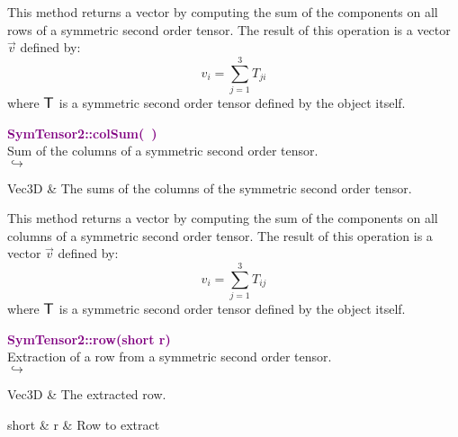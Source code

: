 This method returns a vector by computing the sum of the components on all rows of a symmetric second order tensor.
The result of this operation is a vector $\overrightarrow{v}$ defined by:
\begin{equation*}
v_{i}=\sum_{j=1}^{3} T_{ji}
\end{equation*}
where $\mbox{\large\ensuremath{\mathsf{T}}}$ is a symmetric second order tensor defined by the object itself.

\textcolor{purple}{\textbf{SymTensor2::colSum(~)}}\label{SymTensor2::colSum()}\\
Sum of the columns of a symmetric second order tensor.\\ \hspace*{5mm}$\hookrightarrow$
\vspace*{-2em}\begin{tcolorbox}[grow to left by=-1cm, width=\textwidth-1cm,myArgs,tabularx={l|R}]
Vec3D & The sums of the columns of the symmetric second order tensor.
\end{tcolorbox}

This method returns a vector by computing the sum of the components on all columns of a symmetric second order tensor.
The result of this operation is a vector $\overrightarrow{v}$ defined by:
\begin{equation*}
v_{i}=\sum_{j=1}^{3}T_{ij}
\end{equation*}
where $\mbox{\large\ensuremath{\mathsf{T}}}$ is a symmetric second order tensor defined by the object itself.

\textcolor{purple}{\textbf{SymTensor2::row(short r)}}\label{SymTensor2::row(short r)}\\
Extraction of a row from a symmetric second order tensor.\\ \hspace*{5mm}$\hookrightarrow$
\vspace*{-2em}\begin{tcolorbox}[grow to left by=-1cm, width=\textwidth-1cm,myArgs,tabularx={l|R}]
Vec3D & The extracted row.
\end{tcolorbox}

\begin{tcolorbox}[width=\textwidth,myArgs,tabularx={ll|R}]
short & r & Row to extract
\end{tcolorbox}

